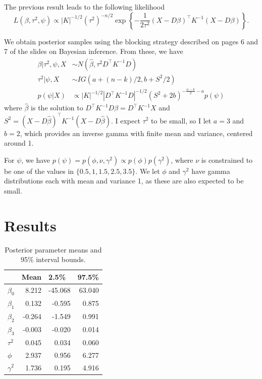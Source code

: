 \documentclass[12pt]{article}
\begin{document}
The previous result leads to the following likelihood
\[ L(\beta, \tau^2, \psi) \propto |K|^{-1/2}(\tau^2)^{-n/2}\exp\left\{-\frac{1}{2\tau^2}(X-D\beta)^\top K^{-1}(X-D\beta)\right\}. \]

We obtain posterior samples using the blocking strategy described on pages 6 and 7 of the slides on Bayesian inference. From these, we have
\begin{align*}
\beta|\tau^2,\psi,X &\sim N(\hat{\beta}, \tau^2 D^\top K^{-1} D) \\
\tau^2|\psi,X &\sim IG(a + (n-k)/2, b + S^2/2) \\
p(\psi|X) &\propto |K|^{-1/2}|D^\top K^{-1} D|^{-1/2}(S^2+2b)^{-\frac{n-k}{2}-a}p(\psi) 
\end{align*}
where $\hat{\beta}$ is the solution to $D^\top K^{-1} D \beta = D^\top K^{-1} X$ and $S^2 = (X-D\hat{\beta})^\top K^{-1} (X - D\hat{\beta})$. I expect $\tau^2$ to be small, so I let $a = 3$ and $b = 2$, which provides an inverse gamma with finite mean and variance, centered around 1.
\bigskip

For $\psi$, we have $p(\psi)=p(\phi,\nu,\gamma^2)\propto p(\phi)p(\gamma^2)$, where $\nu$ is constrained to be one of the values in $\{0.5, 1, 1.5, 2.5, 3.5\}$. We let $\phi$ and $\gamma^2$ have gamma distributions each with mean and variance 1, as these are also expected to be small.

\section{Results}

\begin{table}[ht]
\begin{center}
\begin{tabular}{lrrr}
\hline\hline
 & \multicolumn{1}{l}{Mean}
 & \multicolumn{1}{l}{2.5\%}
 & \multicolumn{1}{l}{97.5\%} \\ \hline
$\beta_0$ &  8.212 & -45.068 & 63.040 \\
$\beta_1$ &  0.132 &  -0.595 &  0.875 \\
$\beta_2$ & -0.264 &  -1.549 &  0.991 \\
$\beta_3$ & -0.003 &  -0.020 &  0.014 \\
$\tau^2$   & 0.045 & 0.034 & 0.060 \\
$\phi$     & 2.937 & 0.956 & 6.277 \\
$\gamma^2$ & 1.736 & 0.195 & 4.916 \\
\hline\hline
\end{tabular}
\end{center}
\caption{Posterior parameter means and 95\% interval bounds.}
\end{table}
\end{document}
